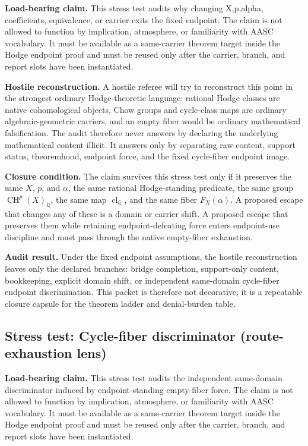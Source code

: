 \documentclass[11pt]{article}
\newcommand{\QQ}{\mathbb{Q}}
\newcommand{\CH}{\operatorname{CH}}
\newcommand{\clQ}{\operatorname{cl}_{\QQ}}
\begin{document}
\par\noindent\textbf{Load-bearing claim.} This stress test audits why changing X,p,alpha, coefficients, equivalence, or carrier exits the fixed endpoint. The claim is not allowed to function by implication, atmosphere, or familiarity with AASC vocabulary. It must be available as a same-carrier theorem target inside the Hodge endpoint proof and must be reused only after the carrier, branch, and report slots have been instantiated.

\par\noindent\textbf{Hostile reconstruction.} A hostile referee will try to reconstruct this point in the strongest ordinary Hodge-theoretic language: rational Hodge classes are native cohomological objects, Chow groups and cycle-class maps are ordinary algebraic-geometric carriers, and an empty fiber would be ordinary mathematical falsification. The audit therefore never answers by declaring the underlying mathematical content illicit. It answers only by separating raw content, support status, theoremhood, endpoint force, and the fixed cycle-fiber endpoint image.

\par\noindent\textbf{Closure condition.} The claim survives this stress test only if it preserves the same $X$, $p$, and $\alpha$, the same rational Hodge-standing predicate, the same group $\CH^p(X)_\QQ$, the same map $\clQ$, and the same fiber $F_X(\alpha)$. A proposed escape that changes any of these is a domain or carrier shift. A proposed escape that preserves them while retaining endpoint-defeating force enters endpoint-use discipline and must pass through the native empty-fiber exhaustion.

\par\noindent\textbf{Audit result.} Under the fixed endpoint assumptions, the hostile reconstruction leaves only the declared branches: bridge completion, support-only content, bookkeeping, explicit domain shift, or independent same-domain cycle-fiber endpoint discrimination. This packet is therefore not decorative; it is a repeatable closure capsule for the theorem ladder and denial-burden table.


\subsection{Stress test: Cycle-fiber discriminator (route-exhaustion lens)}

\par\noindent\textbf{Load-bearing claim.} This stress test audits the independent same-domain discriminator induced by endpoint-standing empty-fiber force. The claim is not allowed to function by implication, atmosphere, or familiarity with AASC vocabulary. It must be available as a same-carrier theorem target inside the Hodge endpoint proof and must be reused only after the carrier, branch, and report slots have been instantiated.
\end{document}
